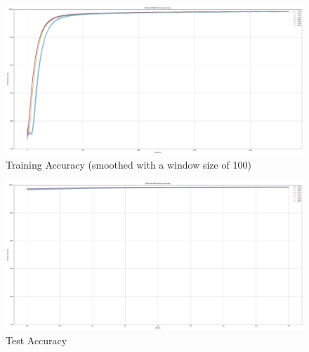         \begin{figure}[H]
            \centering
            \includegraphics[width=\textwidth]{../standard/MNIST/plots/mnist_train_acc.pdf}
            \caption{Training Accuracy (smoothed with a window size of 100)}
        \end{figure}
        \begin{figure}[H]
            \centering
            \includegraphics[width=\textwidth]{../standard/MNIST/plots/mnist_test_acc.pdf}
            \caption{Test Accuracy}
        \end{figure}
